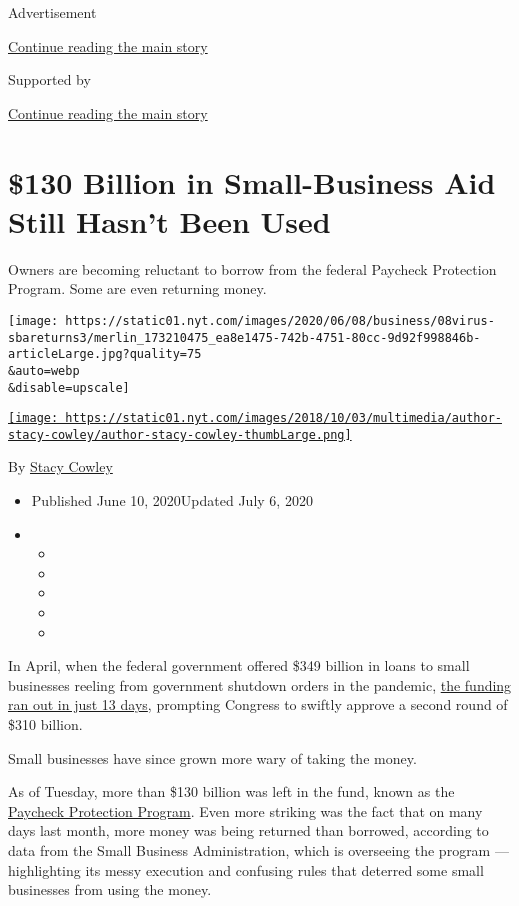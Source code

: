 Advertisement

\protect\hyperlink{after-top}{Continue reading the main story}

Supported by

\protect\hyperlink{after-sponsor}{Continue reading the main story}

\hypertarget{130-billion-in-small-business-aid-still-hasnt-been-used}{%
\section{\$130 Billion in Small-Business Aid Still Hasn't Been
Used}\label{130-billion-in-small-business-aid-still-hasnt-been-used}}

Owners are becoming reluctant to borrow from the federal Paycheck
Protection Program. Some are even returning money.

\texttt{[image: https://static01.nyt.com/images/2020/06/08/business/08virus-sbareturns3/merlin\_173210475\_ea8e1475-742b-4751-80cc-9d92f998846b-articleLarge.jpg?quality=75\\\&auto=webp\\\&disable=upscale]}

\href{https://www.nytimes.com/by/stacy-cowley}{\texttt{[image: https://static01.nyt.com/images/2018/10/03/multimedia/author-stacy-cowley/author-stacy-cowley-thumbLarge.png]}}

By \href{https://www.nytimes.com/by/stacy-cowley}{Stacy Cowley}

\begin{itemize}
\item
  Published June 10, 2020Updated July 6, 2020
\item
  \begin{itemize}
  \item
  \item
  \item
  \item
  \item
  \end{itemize}
\end{itemize}

In April, when the federal government offered \$349 billion in loans to
small businesses reeling from government shutdown orders in the
pandemic,
\href{https://www.nytimes.com/2020/04/16/business/coronavirus-sba-loans-out-of-money.html}{the
funding ran out in just 13 days}, prompting Congress to swiftly approve
a second round of \$310 billion.

Small businesses have since grown more wary of taking the money.

As of Tuesday, more than \$130 billion was left in the fund, known as
the
\href{https://www.nytimes.com/2020/07/06/us/ppp-small-business-loans.html}{Paycheck
Protection Program}. Even more striking was the fact that on many days
last month, more money was being returned than borrowed, according to
data from the Small Business Administration, which is overseeing the
program --- highlighting its messy execution and confusing rules that
deterred some small businesses from using the money.


